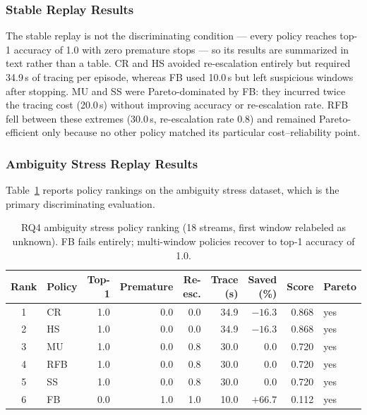\subsubsection{Stable Replay Results}

The stable replay is not the discriminating condition --- every policy reaches top-1 accuracy of 1.0 with zero premature stops --- so its results are summarized in text rather than a table. \textsc{CR} and \textsc{HS} avoided re-escalation entirely but required 34.9\,s of tracing per episode, whereas \textsc{FB} used 10.0\,s but left suspicious windows after stopping. \textsc{MU} and \textsc{SS} were Pareto-dominated by \textsc{FB}: they incurred twice the tracing cost (20.0\,s) without improving accuracy or re-escalation rate. \textsc{RFB} fell between these extremes (30.0\,s, re-escalation rate 0.8) and remained Pareto-efficient only because no other policy matched its particular cost--reliability point.

\subsubsection{Ambiguity Stress Replay Results}

Table~\ref{tab:rq4-stress} reports policy rankings on the ambiguity stress dataset, which
is the primary discriminating evaluation.

\begin{table}[t]
\centering
\caption{RQ4 ambiguity stress policy ranking (18 streams, first window relabeled as
unknown). \textsc{FB} fails entirely; multi-window policies recover to top-1 accuracy
of 1.0.}
\label{tab:rq4-stress}
\footnotesize
\setlength{\tabcolsep}{4pt}
\renewcommand{\arraystretch}{0.95}
\begin{tabular}{clrrrrrrl}
\toprule
\textbf{Rank} & \textbf{Policy} & \textbf{Top-1} & \textbf{Premature} &
\textbf{Re-esc.} & \textbf{Trace (s)} & \textbf{Saved (\%)} &
\textbf{Score} & \textbf{Pareto} \\
\midrule
1 & \textsc{CR} & 1.0 & 0.0 & 0.0 & 34.9 & $-16.3$ & 0.868 & yes \\
2 & \textsc{HS} & 1.0 & 0.0 & 0.0 & 34.9 & $-16.3$ & 0.868 & yes \\
3 & \textsc{MU} & 1.0 & 0.0 & 0.8 & 30.0 &    0.0  & 0.720 & yes \\
4 & \textsc{RFB} & 1.0 & 0.0 & 0.8 & 30.0 &   0.0  & 0.720 & yes \\
5 & \textsc{SS} & 1.0 & 0.0 & 0.8 & 30.0 &    0.0  & 0.720 & yes \\
6 & \textsc{FB} & 0.0 & 1.0 & 1.0 & 10.0 & $+66.7$ & 0.112 & yes \\
\bottomrule
\end{tabular}
\end{table}

